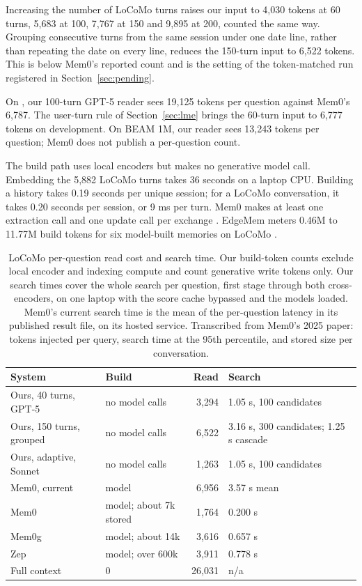 Increasing the number of LoCoMo turns raises our input to 4,030 tokens at 60 turns, 5,683 at 100, 7,767 at 150 and 9,895 at 200, counted the same way. Grouping consecutive turns from the same session under one date line, rather than repeating the date on every line, reduces the 150-turn input to 6,522 tokens. This is below Mem0's reported count and is the setting of the token-matched run registered in Section~\ref{sec:pending}.

On \lmes{}, our 100-turn GPT-5 reader sees 19,125 tokens per question against Mem0's 6,787. The user-turn rule of Section~\ref{sec:lme} brings the 60-turn input to 6,777 tokens on development. On BEAM 1M, our reader sees 13,243 tokens per question; Mem0 does not publish a per-question count.

The build path uses local encoders but makes no generative model call. Embedding the 5,882 LoCoMo turns takes 36 seconds on a laptop CPU. Building a \lmes{} history takes 0.19 seconds per unique session; for a LoCoMo conversation, it takes 0.20 seconds per session, or 9 ms per turn. Mem0 makes at least one extraction call and one update call per exchange \citep{chhikara2025mem0}. EdgeMem meters 0.46M to 11.77M build tokens for six model-built memories on LoCoMo \citep{cui2026edgemem}.

\begin{table}[H]
\caption{LoCoMo per-question read cost and search time. Our build-token counts exclude local encoder and indexing compute and count generative write tokens only. Our search times cover the whole search per question, first stage through both cross-encoders, on one laptop with the score cache bypassed and the models loaded. Mem0's current search time is the mean of the per-question latency in its published result file, on its hosted service. \pub{} Transcribed from Mem0's 2025 paper: tokens injected per query, search time at the 95th percentile, and stored size per conversation.}
\label{tab:cost}
\footnotesize
\setlength{\tabcolsep}{2.4pt}
\centering
\begin{tabular}{@{}L{25mm}L{21mm}rL{22mm}@{}}
\toprule
System & Build & Read & Search \\
\midrule
Ours, 40 turns, GPT-5 & no model calls & 3,294 & 1.05 s, 100 candidates \\
Ours, 150 turns, grouped & no model calls & 6,522 & 3.16 s, 300 candidates; 1.25 s cascade \\
Ours, adaptive, Sonnet & no model calls & 1,263 & 1.05 s, 100 candidates \\
Mem0, current & model & 6,956 & 3.57 s mean \\
Mem0\pub{} & model; about 7k stored & 1,764 & 0.200 s \\
Mem0g\pub{} & model; about 14k & 3,616 & 0.657 s \\
Zep\pub{} & model; over 600k & 3,911 & 0.778 s \\
Full context\pub{} & 0 & 26,031 & n/a \\
\bottomrule
\end{tabular}
\end{table}

